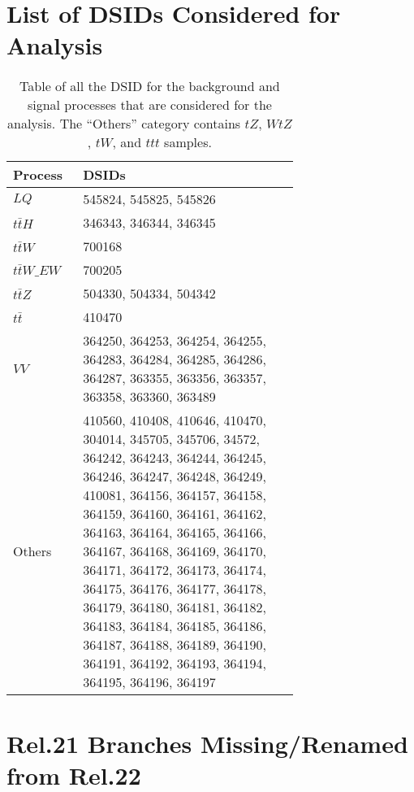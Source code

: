 \section{List of DSIDs Considered for Analysis}\label{DSIDs}
    \renewcommand{\arraystretch}{1.2}
    \begin{table}[h!]
        \centering
        \begin{tabular}{p{0.1\linewidth}|p{0.6\linewidth}}
            Process & DSIDs \\ \hline
            $LQ$        & 545824, 545825, 545826 \\ \hline
            $t\bar{t}H$ & 346343, 346344, 346345 \\ \hline
            $t\bar{t}W$ & 700168 \\ \hline
            $t\bar{t}W\_EW$ & 700205 \\ \hline
            $t\bar{t}Z$ & 504330, 504334, 504342 \\ \hline
            $t\bar{t}$  & 410470 \\ \hline 
            $VV$        & 364250, 364253, 364254, 364255, 364283, 364284, 364285, 364286, 364287, 363355, 363356, 363357, 363358, 363360, 363489 \\ \hline 
            Others      & 410560, 410408, 410646, 410470, 304014, 345705, 345706, 34572, 364242, 364243, 364244, 364245, 364246, 364247, 364248, 364249, 410081, 364156, 364157, 364158, 364159, 364160, 364161, 364162, 364163, 364164, 364165, 364166, 364167, 364168, 364169, 364170, 364171, 364172, 364173, 364174, 364175, 364176, 364177, 364178, 364179, 364180, 364181, 364182, 364183, 364184, 364185, 364186, 364187, 364188, 364189, 364190, 364191, 364192, 364193, 364194, 364195, 364196, 364197 \\[20pt]
        \end{tabular}
        \caption{Table of all the DSID for the background and signal processes that are considered for the analysis. The ``Others'' category contains $tZ$, $WtZ$, $tW$, and $ttt$ samples.}
        \label{signalAndBackgroundDSIDs}
    \end{table}
    \renewcommand{\arraystretch}{1}


\pagebreak
\section{Rel.21 Branches Missing/Renamed from Rel.22}\label{MissingBranches}
